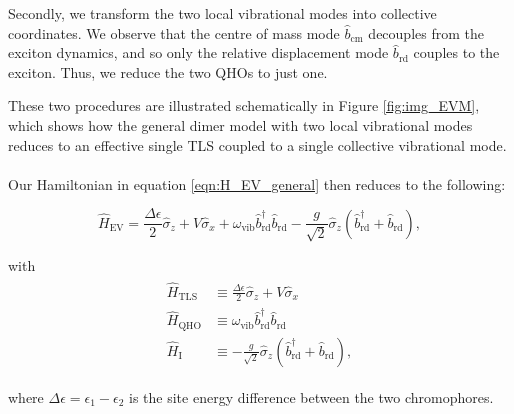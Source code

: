 \documentclass[11pt]{article}
\begin{document}
Secondly, we transform the two local vibrational modes into collective coordinates. We observe that the centre of mass mode $\hat{b}_{\scriptscriptstyle \text{cm}}$ decouples from the exciton dynamics, and so only the relative displacement mode $\hat{b}_{\scriptscriptstyle \text{rd}}$ couples to the exciton. Thus, we reduce the two QHOs to just one.

These two procedures are illustrated schematically in Figure \ref{fig:img_EVM}, which shows how the general dimer model with two local vibrational modes reduces to an effective single TLS coupled to a single collective vibrational mode.\\
\\
Our Hamiltonian in equation \eqref{eqn:H_EV_general} then reduces to the following:

\begin{equation} \label{eqn:H_EV}
    \hat{H}_{\scriptscriptstyle \text{EV}} = \frac{\Delta\epsilon}{2}\hat{\sigma}_z + V\hat{\sigma}_x + \omega_{\scriptscriptstyle \text{vib}} \hat{b}_{\scriptscriptstyle \text{rd}}^\dagger \hat{b}_{\scriptscriptstyle \text{rd}} -\frac{g}{\sqrt{2}}\hat{\sigma}_z\left(\hat{b}_{\scriptscriptstyle \text{rd}}^\dagger + \hat{b}_{\scriptscriptstyle \text{rd}}\right),
\end{equation}

with 
\begin{align*}
    \begin{aligned}
        \hat{H}_{\scriptscriptstyle \text{TLS}} &\equiv \frac{\Delta\epsilon}{2}\hat{\sigma}_z + V\hat{\sigma}_x \\
        \hat{H}_{\scriptscriptstyle \text{QHO}} &\equiv \omega_{\scriptscriptstyle \text{vib}} \hat{b}_{\scriptscriptstyle \text{rd}}^\dagger \hat{b}_{\scriptscriptstyle \text{rd}} \\
        \hat{H}_{\scriptscriptstyle \text{I}} &\equiv-\frac{g}{\sqrt{2}}\hat{\sigma}_z\left(\hat{b}_{\scriptscriptstyle \text{rd}}^\dagger + \hat{b}_{\scriptscriptstyle \text{rd}}\right),
    \end{aligned}
\end{align*}

where $\Delta\epsilon = \epsilon_1 - \epsilon_2$ is the site energy difference between the two chromophores. \\
\end{document}
